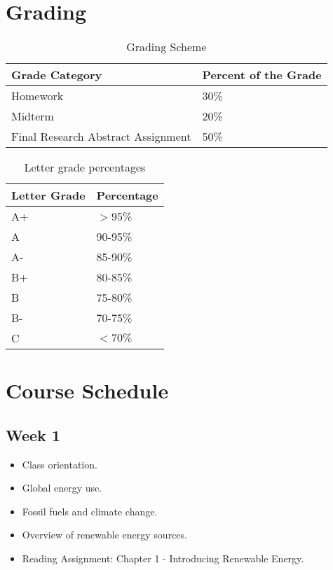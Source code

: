\documentclass[11pt]{article}
\begin{document}
\section{Grading}
	
	\begin{table}[h!]
	    \centering
	    \begin{tabular}{|l|l|}
	         	\hline\hline
	Grade Category	& Percent of the Grade		\\
		\hline\hline  
		Homework	& 30\%	\\
		Midterm & 20\%\\
		Final Research Abstract Assignment	& 50\%	\\
		\hline\hline
	    \end{tabular}
	    \caption{Grading Scheme}
	    \label{tab:grades1}
	\end{table}
	
	\begin{table}[h!]
	    \centering
	    \begin{tabular}{|l|l|}
	         	\hline\hline
	Letter Grade	& Percentage		\\
		\hline\hline  
		A+	& $>$95\%	\\
		A	& 90-95\%	\\
		A-	& 85-90\%	\\
		B+	& 80-85\%	\\
		B & 75-80\%\\
		B-& 70-75\%\\
		C&$<70\%$\\
		\hline\hline
	    \end{tabular}
	    \caption{Letter grade percentages}
	    \label{tab:grades2}
	\end{table}
	
	\newpage
	\section{Course Schedule}
	\subsection*{Week 1}
	\begin{itemize}
	    \item Class orientation.
	    \item Global energy use.
	    \item Fossil fuels and climate change.
	    \item Overview of renewable energy sources.
	    \item Reading Assignment: Chapter 1 - Introducing Renewable Energy.
	\end{itemize}
\end{document}
